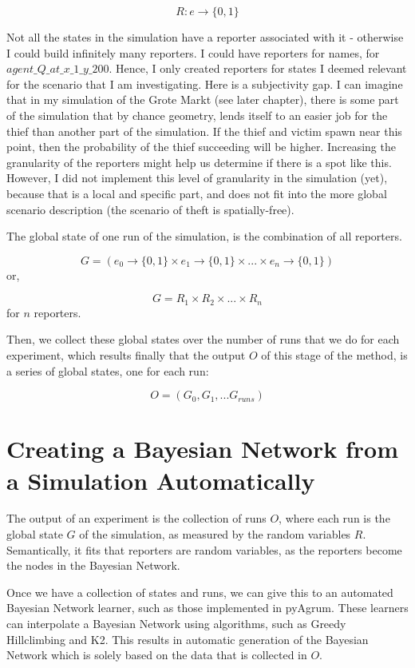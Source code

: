 \[ R : e \rightarrow \{0, 1\} \]

Not all the states in the simulation have a reporter associated with it - otherwise I could build infinitely many reporters. I could have reporters for names, for $agent\_Q\_at\_x\_1\_y\_200$. Hence, I only created reporters for states I deemed relevant for the scenario that I am investigating. Here is a subjectivity gap. I can imagine that in my simulation of the Grote Markt (see later chapter), there is some part of the simulation that by chance geometry, lends itself to an easier job for the thief than another part of the simulation. If the thief and victim spawn near this point, then the probability of the thief succeeding will be higher. Increasing the granularity of the reporters might help us determine if there is a spot like this. However, I did not implement this level of granularity in the simulation (yet), because that is a local and specific part, and does not fit into the more global scenario description (the scenario of theft is spatially-free).

The global state of one run of the simulation, is the combination of all reporters.

\[ G = (e_0 \rightarrow \{0, 1\} \times e_1 \rightarrow \{0, 1\} \times ... \times e_n \rightarrow \{0, 1\})\]
 or,
 
\[ G = R_1 \times R_2 \times... \times R_n\]
for $n$ reporters.

Then, we collect these global states over the number of runs that we do for each experiment, which results finally that the output $O$ of this stage of the method, is a series of global states, one for each run:

\[ O = (G_0, G_1, ... G_{runs})\]


\section{Creating a Bayesian Network from a Simulation Automatically}

The output of an experiment is the collection of runs $O$, where each run is the global state $G$ of the simulation, as measured by the random variables $R$. Semantically, it fits that reporters are random variables, as the reporters become the nodes in the Bayesian Network.

Once we have a collection of states and runs, we can give this to an automated Bayesian Network learner, such as those implemented in pyAgrum. These learners can interpolate a Bayesian Network using algorithms, such as Greedy Hillclimbing and K2. This results in automatic generation of the Bayesian Network which is solely based on the data that is collected in $O$. 

